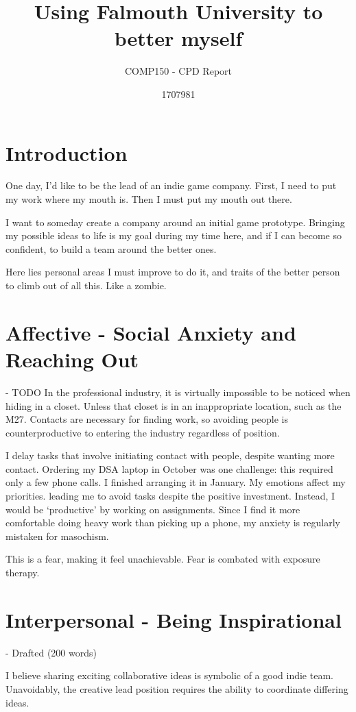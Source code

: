 \documentclass{scrartcl}
\title{Using Falmouth University to better myself}
\subtitle{COMP150 - CPD Report}
\author{1707981}
\begin{document}
\maketitle

\section{Introduction}
One day, I'd like to be the lead of an indie game company. First, I need to put my work where my mouth is. Then I must put my mouth out there.

I want to someday create a company around an initial game prototype. Bringing my possible ideas to life is my goal during my time here, and if I can become so confident, to build a team around the better ones.

Here lies personal areas I must improve to do it, and traits of the better person to climb out of all this. Like a zombie.

\section{Affective - Social Anxiety and Reaching Out} - TODO
In the professional industry, it is virtually impossible to be noticed when hiding in a closet. Unless that closet is in an inappropriate location, such as the M27. Contacts are necessary for finding work, so avoiding people is counterproductive to entering the industry regardless of position.

I delay tasks that involve initiating contact with people, despite wanting more contact. Ordering my DSA laptop in October was one challenge: this required only a few phone calls. I finished arranging it in January. My emotions affect my priorities. leading me to avoid tasks despite the positive investment. Instead, I would be `productive' by working on assignments. Since I find it more comfortable doing heavy work than picking up a phone, my anxiety is regularly mistaken for masochism.

This is a fear, making it feel unachievable. Fear is combated with exposure therapy. 

\section{Interpersonal - Being Inspirational} - Drafted (200 words)

I believe sharing exciting collaborative ideas is symbolic of a good indie team. Unavoidably, the creative lead position requires the ability to coordinate differing ideas.
\end{document}
